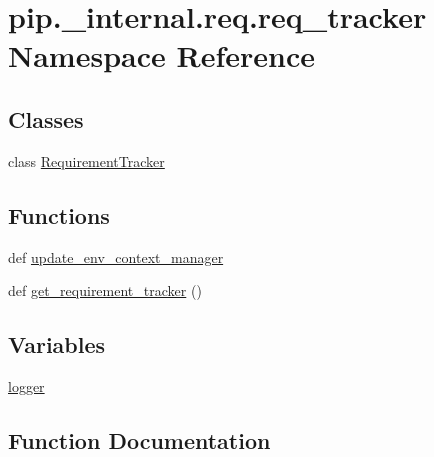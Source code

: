 \hypertarget{namespacepip_1_1__internal_1_1req_1_1req__tracker}{}\section{pip.\+\_\+internal.\+req.\+req\+\_\+tracker Namespace Reference}
\label{namespacepip_1_1__internal_1_1req_1_1req__tracker}
\subsection*{Classes}
\begin{DoxyCompactItemize}
\item 
class \hyperlink{classpip_1_1__internal_1_1req_1_1req__tracker_1_1RequirementTracker}{Requirement\+Tracker}
\end{DoxyCompactItemize}
\subsection*{Functions}
\begin{DoxyCompactItemize}
\item 
def \hyperlink{namespacepip_1_1__internal_1_1req_1_1req__tracker_af689c10ade2daa9a4bb92bbe46bf08cc}{update\+\_\+env\+\_\+context\+\_\+manager}
\item 
def \hyperlink{namespacepip_1_1__internal_1_1req_1_1req__tracker_a596c764b9b20596f71245a58dbcd0952}{get\+\_\+requirement\+\_\+tracker} ()
\end{DoxyCompactItemize}
\subsection*{Variables}
\begin{DoxyCompactItemize}
\item 
\hyperlink{namespacepip_1_1__internal_1_1req_1_1req__tracker_af38f8d9c39bbeab5935dd2c175e566fe}{logger}
\end{DoxyCompactItemize}


\subsection{Function Documentation}
\mbox{\label{namespacepip_1_1__internal_1_1req_1_1req__tracker_a596c764b9b20596f71245a58dbcd0952}} 
